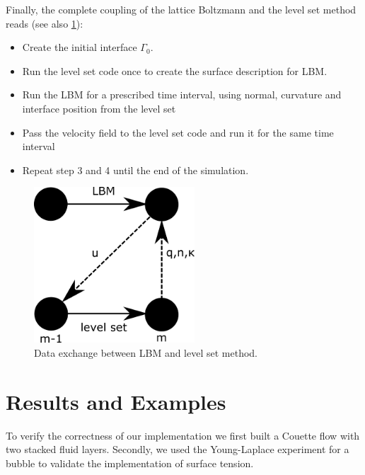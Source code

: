 \documentclass[final,leqno,onefignum,onetabnum]{siamltexmm}
\begin{document}
Finally, the complete coupling of the lattice Boltzmann and the level set method reads (see also \cref{dataexchange}):
\begin{itemize}
	\item[1.] Create the initial interface $\Gamma_0$.
	\item[2.] Run the level set code once to create the surface description for LBM.
	\item[3.] Run the LBM  for a prescribed time interval, using normal, curvature and interface position from the level set
	\item[4.] Pass the velocity field to the level set code and run it for the same time interval
	\item[5.] Repeat step 3 and 4 until the end of the simulation.
\end{itemize}
\begin{figure}[h!]
	\hfill\includegraphics[width=6cm,natwidth=632,natheight=562]{dataexchange.png}\hspace*{\fill}
	\caption{Data exchange between LBM and level set method.}
	\label{dataexchange}
\end{figure}

\section{Results and Examples}
To verify the correctness of our implementation we first built a Couette flow with two stacked fluid layers. Secondly, we used the Young-Laplace experiment for a bubble to validate the implementation of surface tension.
\end{document}
